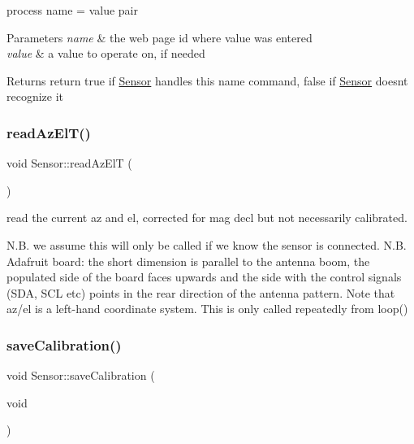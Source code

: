 process name = value pair 


\begin{DoxyParams}{Parameters}
{\em name} & the web page id where value was entered \\
\hline
{\em value} & a value to operate on, if needed \\
\hline
\end{DoxyParams}
\begin{DoxyReturn}{Returns}
return true if \hyperlink{class_sensor}{Sensor} handles this \textquotesingle{}name\textquotesingle{} command, false if \hyperlink{class_sensor}{Sensor} doesn\textquotesingle{}t recognize it 
\end{DoxyReturn}
\mbox{\label{class_sensor_afc67b7e3e26688fa9553c6ae6f07c04b}} 
\subsubsection{\texorpdfstring{read\+Az\+El\+T()}{readAzElT()}}
{\footnotesize\ttfamily void Sensor\+::read\+Az\+ElT (\begin{DoxyParamCaption}{ }\end{DoxyParamCaption})}



read the current az and el, corrected for mag decl but not necessarily calibrated. 

N.\+B. we assume this will only be called if we know the sensor is connected. N.\+B. Adafruit board\+: the short dimension is parallel to the antenna boom, the populated side of the board faces upwards and the side with the control signals (S\+DA, S\+CL etc) points in the rear direction of the antenna pattern. Note that az/el is a left-\/hand coordinate system. This is only called repeatedly from loop() \mbox{\label{class_sensor_a106849dcbe07faca4c96547f1278ad72}} 
\subsubsection{\texorpdfstring{save\+Calibration()}{saveCalibration()}}
{\footnotesize\ttfamily void Sensor\+::save\+Calibration (\begin{DoxyParamCaption}\item[{void}]{ }\end{DoxyParamCaption})}



